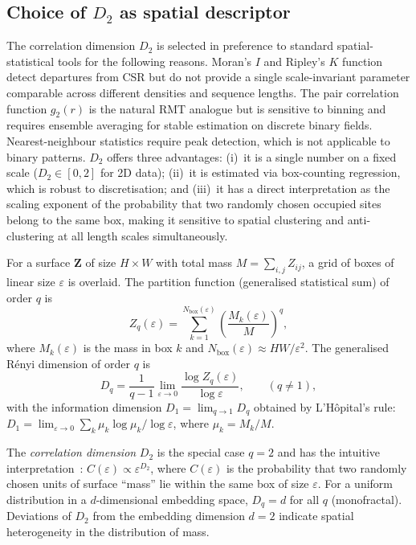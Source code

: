 \documentclass[final,3p,times,twocolumn]{elsarticle}
\theoremstyle{definition}
\begin{document}
\subsection{Choice of $D_2$ as spatial descriptor}

The correlation dimension $D_2$ is selected in preference to
standard spatial-statistical tools for the following reasons.
Moran's $I$ and Ripley's $K$ function detect departures from CSR
but do not provide a single scale-invariant parameter comparable
across different densities and sequence lengths. The pair
correlation function $g_2(r)$ is the natural RMT analogue but is
sensitive to binning and requires ensemble averaging for stable
estimation on discrete binary fields. Nearest-neighbour statistics
require peak detection, which is not applicable to binary patterns.
$D_2$ offers three advantages: (i)~it is a single number on a fixed
scale ($D_2 \in [0,2]$ for 2D data); (ii)~it is estimated via
box-counting regression, which is robust to discretisation; and
(iii)~it has a direct interpretation as the scaling exponent of
the probability that two randomly chosen occupied sites belong to
the same box, making it sensitive to spatial clustering and
anti-clustering at all length scales simultaneously.

For a surface $\mathbf{Z}$ of size $H \times W$ with total mass
$M = \sum_{i,j} Z_{ij}$, a grid of boxes of linear size $\varepsilon$
is overlaid. The partition function (generalised statistical sum) of
order $q$ is
\begin{equation}
  Z_q(\varepsilon) = \sum_{k=1}^{N_{\text{box}}(\varepsilon)}
  \left(\frac{M_k(\varepsilon)}{M}\right)^q,
  \label{eq:partfun}
\end{equation}
where $M_k(\varepsilon)$ is the mass in box $k$ and
$N_{\text{box}}(\varepsilon) \approx HW/\varepsilon^2$. The generalised
R\'enyi dimension of order $q$ is~\cite{RENYI-DIMENSIONS, HENTSCHEL-PROCACCIA-1983}
\begin{equation}
  D_q = \frac{1}{q-1} \lim_{\varepsilon \to 0}
        \frac{\log Z_q(\varepsilon)}{\log \varepsilon},
        \qquad (q \neq 1),
  \label{eq:Dq}
\end{equation}
with the information dimension $D_1 = \lim_{q \to 1} D_q$ obtained by
L'H\^opital's rule:
$D_1 = \lim_{\varepsilon \to 0} \sum_k \mu_k \log \mu_k / \log \varepsilon$,
where $\mu_k = M_k/M$.

The \emph{correlation dimension} $D_2$ is the special case $q=2$ and
has the intuitive interpretation~\cite{GRASSBERGER-PROCACCIA-1983}:
$C(\varepsilon) \propto \varepsilon^{D_2}$, where $C(\varepsilon)$ is
the probability that two randomly chosen units of surface ``mass'' lie
within the same box of size $\varepsilon$. For a uniform distribution
in a $d$-dimensional embedding space, $D_q = d$ for all $q$
(monofractal). Deviations of $D_2$ from the embedding dimension $d=2$
indicate spatial heterogeneity in the distribution of mass.
\end{document}
